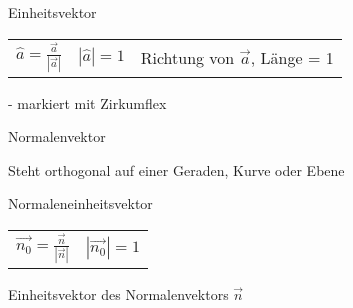 \begin{sectionbox}
	Einheitsvektor
	\begin{emphbox}
		\begin{tabular}{ccc}
	 		$ \hat{a} = \frac{\overrightarrow{a}}{|\overrightarrow{a}|} $ &
	 		$|\hat{a}| = 1 $ & Richtung von $\overrightarrow{a}$, Länge = 1
		\end{tabular}
	\end{emphbox}
	- markiert mit Zirkumflex
	
	Normalenvektor

	Steht orthogonal auf einer Geraden, Kurve oder Ebene

	Normaleneinheitsvektor
	\begin{emphbox}
		\begin{tabular}{cc}
			$\overrightarrow{n_0} = \frac{\overrightarrow{n}}{|\overrightarrow{n}|}$ &
	 		$|\overrightarrow{n_0}| = 1 $
		\end{tabular}
	\end{emphbox}
	Einheitsvektor des Normalenvektors $\overrightarrow{n}$
\end{sectionbox}

